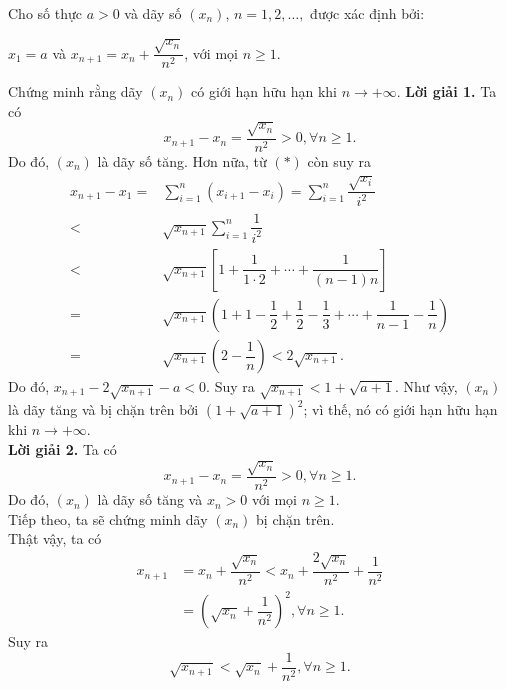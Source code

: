 \begin{bt}%
	Cho số thực $a>0$ và dãy số $(x_n)$, $n=1,2,\ldots,$ được xác định bởi:
	\begin{center}
		$x_1=a$ và $x_{n+1}=x_n+\dfrac{\sqrt{x_n}}{n^2}$, với mọi $n\geqslant 1$.
	\end{center}
	Chứng minh rằng dãy $(x_n)$ có giới hạn hữu hạn khi $n\rightarrow +\infty$.
	\loigiai
	{\textbf{Lời giải 1.} %
		Ta có \[x_{n+1}-x_n=\dfrac{\sqrt{x_n}}{n^2}>0, \forall n\geqslant1.\tag{*}\]
		Do đó, $(x_n)$ là dãy số tăng.
		Hơn nữa, từ $(*)$ còn suy ra
		{\allowdisplaybreaks
			\begin{align*}
			x_{n+1}-x_1=&\displaystyle \sum_{i=1}^{n}(x_{i+1}-x_i)=\displaystyle \sum_{i=1}^{n} \dfrac{\sqrt{x_i}}{i^2}\\
			<& \sqrt{x_{n+1}}\displaystyle \sum_{i=1}^{n} \dfrac{1}{i^2}\\
			<& \sqrt{x_{n+1}}\left[1+\dfrac{1}{1\cdot 2}+\cdots+\dfrac{1}{(n-1)n}\right]\\
			=& \sqrt{x_{n+1}}\left(1+1-\dfrac{1}{2}+\dfrac{1}{2}-\dfrac{1}{3}+\cdots+\dfrac{1}{n-1}-\dfrac{1}{n}\right)\\
			=& \sqrt{x_{n+1}}\left(2-\dfrac{1}{n}\right)<2\sqrt{x_{n+1}}.
			\end{align*}}Do đó, $x_{n+1}-2\sqrt{x_{n+1}}-a<0$. Suy ra $\sqrt{x_{n+1}}<1+\sqrt{a+1}$.
		Như vậy, $(x_n)$ là dãy tăng và bị chặn trên bởi $\left(1+\sqrt{a+1}\right)^2$; vì thế, nó có giới hạn hữu hạn khi $n\rightarrow +\infty$.\\
		\textbf{Lời giải 2.} %
		Ta có \[x_{n+1}-x_n=\dfrac{\sqrt{x_n}}{n^2}>0, \forall n\geqslant1.\]
		Do đó, $(x_n)$ là dãy số tăng và $x_n>0$ với mọi $n\geqslant 1$.\\
		Tiếp theo, ta sẽ chứng minh dãy $(x_n)$ bị chặn trên.\\
		Thật vậy, ta có
		{\allowdisplaybreaks
		\begin{align*}
		x_{n+1}&=x_n+\dfrac{\sqrt{x_n}}{n^2}<x_n+\dfrac{2\sqrt{x_n}}{n^2}+\dfrac{1}{n^2}\\
		&=\left(\sqrt{x_n}+\dfrac{1}{n^2}\right)^2, \forall n\geqslant 1.	
		\end{align*}}Suy ra \[\sqrt{x_{n+1}}<\sqrt{x_n}+\dfrac{1}{n^2}, \forall n\geqslant1.\]
}
\end{bt}
